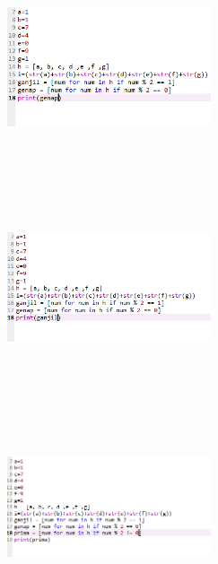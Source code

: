 \begin{enumerate}
\begin{figure}
\end{figure}
\begin{figure}
\item
\center
\includegraphics[width=6cm,height=6cm]{figures/c19.png}
\end{figure}
\begin{figure}
\item
\center
\includegraphics[width=6cm,height=6cm]{figures/c20.png}
\end{figure}
\begin{figure}
\item
\center
\includegraphics[width=6cm,height=6cm]{figures/c21.png}
\end{figure}
\end{enumerate}





